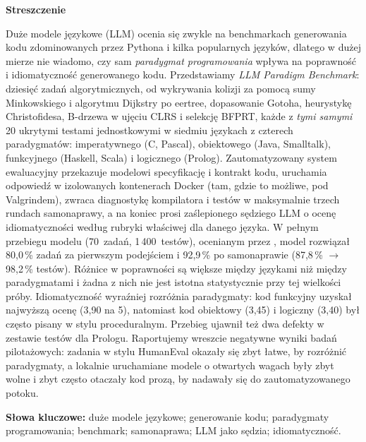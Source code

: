 \begin{center}\textbf{Streszczenie}\end{center}
\vspace{-4pt}
{\small
Duże modele językowe (LLM) ocenia się zwykle na benchmarkach generowania kodu zdominowanych przez
Pythona i kilka popularnych języków, dlatego w dużej mierze nie wiadomo, czy sam \emph{paradygmat
programowania} wpływa na poprawność i idiomatyczność generowanego kodu. Przedstawiamy
\emph{LLM Paradigm Benchmark}: dziesięć zadań algorytmicznych, od wykrywania kolizji za pomocą sumy
Minkowskiego i algorytmu Dijkstry po eertree, dopasowanie Gotoha, heurystykę Christofidesa, B-drzewa
w ujęciu CLRS i selekcję BFPRT, każde z \emph{tymi samymi} 20 ukrytymi testami jednostkowymi
w siedmiu językach z czterech paradygmatów: imperatywnego (C, Pascal), obiektowego (Java, Smalltalk),
funkcyjnego (Haskell, Scala) i logicznego (Prolog). Zautomatyzowany system ewaluacyjny przekazuje
modelowi specyfikację i kontrakt kodu, uruchamia odpowiedź w izolowanych kontenerach Docker (tam,
gdzie to możliwe, pod Valgrindem), zwraca diagnostykę kompilatora i testów w maksymalnie trzech
rundach samonaprawy, a na koniec prosi zaślepionego sędziego LLM o ocenę idiomatyczności według
rubryki właściwej dla danego języka. W pełnym przebiegu modelu \haiku{} (70~zadań, 1\,400~testów),
ocenianym przez \sonnet{}, model rozwiązał 80,0\,\% zadań za pierwszym podejściem i 92,9\,\% po
samonaprawie (87,8\,\% $\to$ 98,2\,\% testów). Różnice w poprawności są większe między językami niż
między paradygmatami i żadna z nich nie jest istotna statystycznie przy tej wielkości próby.
Idiomatyczność wyraźniej rozróżnia paradygmaty: kod funkcyjny uzyskał najwyższą ocenę (3,90 na 5),
natomiast kod obiektowy (3,45) i logiczny (3,40) był często pisany w stylu proceduralnym. Przebieg
ujawnił też dwa defekty w zestawie testów dla Prologu. Raportujemy wreszcie negatywne wyniki badań
pilotażowych: zadania w stylu HumanEval okazały się zbyt łatwe, by rozróżnić paradygmaty, a lokalnie
uruchamiane modele o otwartych wagach były zbyt wolne i zbyt często otaczały kod prozą, by nadawały
się do zautomatyzowanego potoku.\par}

\vspace{6pt}
{\small\noindent\textbf{Słowa kluczowe:} duże modele językowe; generowanie kodu; paradygmaty
programowania; benchmark; samonaprawa; LLM jako sędzia; idiomatyczność.\par}
